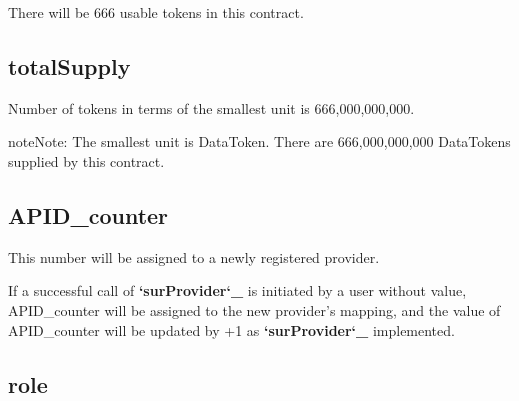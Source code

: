 \documentclass[letterpaper,10pt,english]{sphinxmanual}
\begin{document}
There will be 666 usable tokens in this contract.


\subsection{totalSupply}
\label{\detokenize{ContractVariables:totalsupply}}
%
\begin{sphinxVerbatim}[commandchars=\\\{\}]
       
\end{sphinxVerbatim}

Number of tokens in terms of the smallest unit
is 666,000,000,000.

\begin{sphinxadmonition}{note}{Note:}
The smallest unit is DataToken. There are 666,000,000,000 DataTokens supplied by this contract.
\end{sphinxadmonition}


\subsection{APID\_counter}
\label{\detokenize{ContractVariables:apid-counter}}
%
\begin{sphinxVerbatim}[commandchars=\\\{\}]
   
\end{sphinxVerbatim}

This number will be assigned to a newly registered provider.

If a successful call of {\color{red}\bfseries{}{}`surProvider{}`\_} is initiated by
a user without {\hyperref[\detokenize{ContractVariables:apid}]{}} value,
APID\_counter will be assigned to the new provider’s {\hyperref[\detokenize{ContractVariables:apid}]{}} mapping,
and the value of APID\_counter will be updated by +1 as {\color{red}\bfseries{}{}`surProvider{}`\_} implemented.


\subsection{role}
\label{\detokenize{ContractVariables:role}}
%
\begin{sphinxVerbatim}[commandchars=\\\{\}]
    
\end{sphinxVerbatim}
\end{document}

